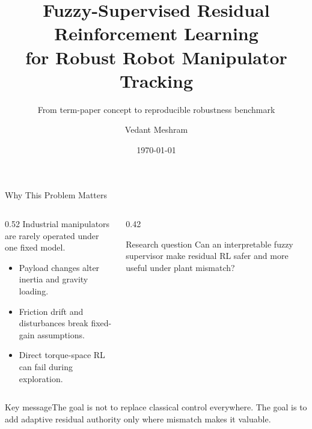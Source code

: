 \documentclass[aspectratio=169,10pt]{beamer}
\title[Fuzzy-Supervised Residual RL]{Fuzzy-Supervised Residual Reinforcement Learning\\for Robust Robot Manipulator Tracking}
\subtitle{From term-paper concept to reproducible robustness benchmark}
\author[Vedant Meshram]{Vedant Meshram}
\institute[IIT Kharagpur]{Department of Mechanical Engineering\\Indian Institute of Technology Kharagpur}
\date{\today}
\newcommand{\smallgap}{\vspace{0.35em}}
\newcommand{\keyclaim}[1]{\begin{block}{Key message}#1\end{block}}
\begin{document}
\begin{frame}
  \titlepage
\end{frame}

\begin{frame}{Why This Problem Matters}
  \begin{columns}[T,onlytextwidth]
    \begin{column}{0.52\textwidth}
      Industrial manipulators are rarely operated under one fixed model.
      \smallgap
      \begin{itemize}
        \item Payload changes alter inertia and gravity loading.
        \item Friction drift and disturbances break fixed-gain assumptions.
        \item Direct torque-space RL can fail during exploration.
      \end{itemize}
    \end{column}
    \begin{column}{0.42\textwidth}
      \begin{block}{Research question}
        Can an interpretable fuzzy supervisor make residual RL safer and more useful under plant mismatch?
      \end{block}
    \end{column}
  \end{columns}
  \vfill
  \keyclaim{The goal is not to replace classical control everywhere. The goal is to add adaptive residual authority only where mismatch makes it valuable.}
\end{frame}
\end{document}
